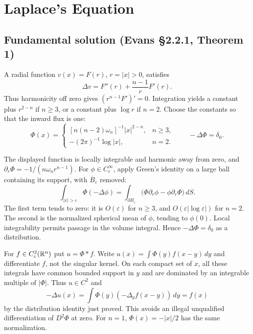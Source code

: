 \section{Laplace's Equation}
\label{sec:2-2}

\subsection{Fundamental solution (Evans \S2.2.1, Theorem 1)}
A radial function $v(x)=F(r)$, $r=|x|>0$, satisfies
\[
 \Delta v=F''(r)+\frac{n-1}rF'(r).
\]
Thus harmonicity off zero gives $(r^{n-1}F')'=0$. Integration yields
a constant plus $r^{2-n}$ if $n\geq3$, or a constant plus $\log r$
if $n=2$. Choose the constants so that the inward flux is one:
\[
 \Phi(x)=
 \begin{cases}
 [n(n-2)\omega_n]^{-1}|x|^{2-n},&n\geq3,\\
 -(2\pi)^{-1}\log|x|,&n=2.
 \end{cases}
 \qquad -\Delta\Phi=\delta_0.
\]
\Needspace{45mm}
\begin{expandedproof}
The displayed function is locally integrable and harmonic away from zero,
and $\partial_r\Phi=-1/(n\omega_n r^{n-1})$.
For $\phi\in C_c^\infty$, apply Green's identity on a large ball
containing its support, with $\overline B_\varepsilon$ removed:
\[
 \int_{|x|>\varepsilon}\Phi(-\Delta\phi)
 =\int_{\partial B_\varepsilon}
      \bigl(\Phi\partial_r\phi-\phi\partial_r\Phi\bigr)\,dS.
\]
The first term tends to zero: it is $O(\varepsilon)$ for $n\geq3$,
and $O(\varepsilon|\log\varepsilon|)$ for $n=2$.
The second is the normalized spherical mean of $\phi$, tending to
$\phi(0)$. Local integrability permits passage in the volume integral.
Hence $-\Delta\Phi=\delta_0$ as a distribution.
\end{expandedproof}

For $f\in C_c^2(\mathbb{R}^n)$ put $u=\Phi*f$. Write
$u(x)=\int\Phi(y)f(x-y)\,dy$ and differentiate $f$, not the singular
kernel. On each compact set of $x$, all these integrals have common
bounded support in $y$ and are dominated by an integrable multiple of
$|\Phi|$. Thus $u\in C^2$ and
\[
 -\Delta u(x)=\int\Phi(y)(-\Delta_y f(x-y))\,dy=f(x)
\]
by the distribution identity just proved. This avoids an illegal
unqualified differentiation of $D^2\Phi$ at zero.
For $n=1$, $\Phi(x)=-|x|/2$ has the same normalization.


